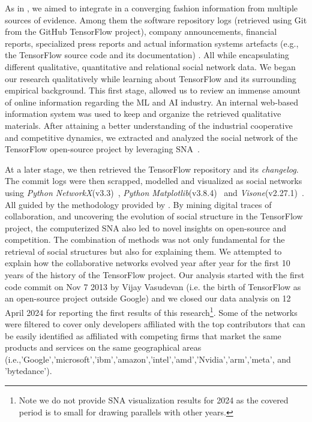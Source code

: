 \documentclass[CHICAGO,Times1COL]{WileyNJDv5} %
\begin{document}
\begin{table}[h]
\begin{threeparttable}
\end{threeparttable}
\end{table}


As in \citet{TeixeiraMian_et_al2016}, we aimed to integrate in a converging fashion information from multiple sources of evidence. Among them the software repository logs
(retrieved using Git from the GitHub TensorFlow project), company announcements, financial reports, specialized press reports and actual information systems artefacts
(e.g., the
TensorFlow source code and its documentation) . All while encapsulating different qualitative, quantitative and relational social network  data. We began our research qualitatively while learning about TensorFlow and its surrounding empirical background. This first stage, allowed us to review an immense amount of online
information regarding the \ac{ML} and \ac{AI} industry. An internal web-based information system was used to keep and organize the
retrieved qualitative materials.
After attaining a better understanding of the industrial cooperative and competitive dynamics,  we extracted and analyzed the social network of the TensorFlow open-source
project by leveraging
SNA~\citep{wasserman_social_1994}. %



At a later stage, we then retrieved the TensorFlow repository and its \emph{changelog}. The commit logs were then scrapped, modelled and visualized as social networks
using \emph{Python NetworkX}(v3.3)~\citep[][]{HagbergSwart_et_al2008},  \emph{Python
Matplotlib}(v3.8.4)~\citep[][]{Hunter2007} and \emph{Visone}(v2.27.1)~\citep[][]{brandes2004analysis}. All guided by the methodology provided by \citet{teixeira2015lessons}.  By mining digital traces of collaboration, and uncovering the evolution of social structure in the
TensorFlow project, the computerized SNA also led to novel insights on open-source and competition. The combination of methods was not only fundamental for the retrieval
of social structures but also for explaining them. We attempted to explain how the collaborative networks evolved year after year for the first 10 years of the history of
the TensorFlow project. Our analysis started with the first code commit on Nov 7 2013 by Vijay Vasudevan (i.e. the birth of TensorFlow as an open-source project outside
Google) and we closed our data analysis on 12 April 2024 for reporting the first results of this research\footnote{Note we do not provide SNA visualization results for 2024 as the covered period is to small for drawing parallels with other years.}. Some of the networks were filtered to cover only developers
affiliated with the top contributors that can be easily identified as affiliated with competing firms that market the same products and services on the same geographical
areas
(i.e.,'Google','microsoft','ibm','amazon','intel','amd','Nvidia','arm','meta', and 'bytedance').
\end{document}
